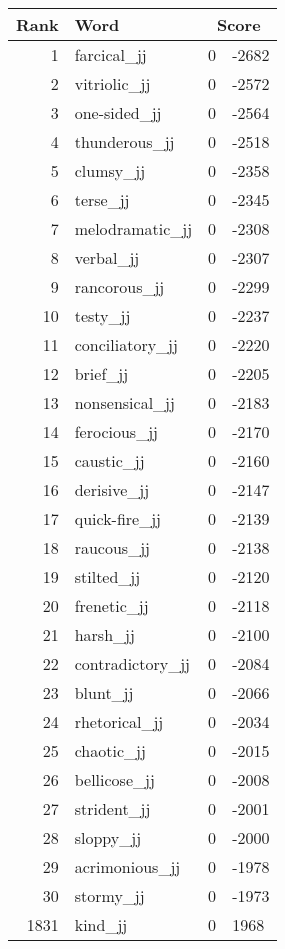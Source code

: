 \begin{longtable}[!htbp]{| rlr@{.}l |}
    \hline
    \textbf{Rank} & \textbf{Word} & \multicolumn{2}{c|}{\textbf{Score}} \\
    \hline
    \endhead
    1 & farcical\_jj & 0 & -2682 \\
    2 & vitriolic\_jj & 0 & -2572 \\
    3 & one-sided\_jj & 0 & -2564 \\
    4 & thunderous\_jj & 0 & -2518 \\
    5 & clumsy\_jj & 0 & -2358 \\
    6 & terse\_jj & 0 & -2345 \\
    7 & melodramatic\_jj & 0 & -2308 \\
    8 & verbal\_jj & 0 & -2307 \\
    9 & rancorous\_jj & 0 & -2299 \\
    10 & testy\_jj & 0 & -2237 \\
    11 & conciliatory\_jj & 0 & -2220 \\
    12 & brief\_jj & 0 & -2205 \\
    13 & nonsensical\_jj & 0 & -2183 \\
    14 & ferocious\_jj & 0 & -2170 \\
    15 & caustic\_jj & 0 & -2160 \\
    16 & derisive\_jj & 0 & -2147 \\
    17 & quick-fire\_jj & 0 & -2139 \\
    18 & raucous\_jj & 0 & -2138 \\
    19 & stilted\_jj & 0 & -2120 \\
    20 & frenetic\_jj & 0 & -2118 \\
    21 & harsh\_jj & 0 & -2100 \\
    22 & contradictory\_jj & 0 & -2084 \\
    23 & blunt\_jj & 0 & -2066 \\
    24 & rhetorical\_jj & 0 & -2034 \\
    25 & chaotic\_jj & 0 & -2015 \\
    26 & bellicose\_jj & 0 & -2008 \\
    27 & strident\_jj & 0 & -2001 \\
    28 & sloppy\_jj & 0 & -2000 \\
    29 & acrimonious\_jj & 0 & -1978 \\
    30 & stormy\_jj & 0 & -1973 \\
    1831 & kind\_jj & 0 & 1968 \\

\end{longtable}
